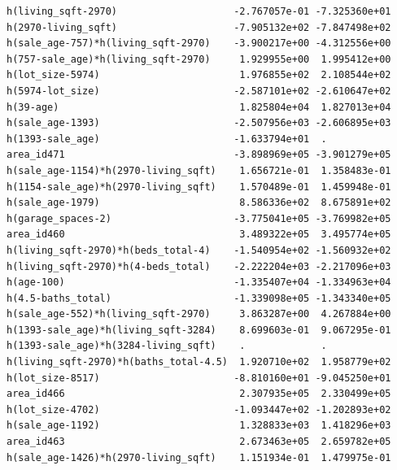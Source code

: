 \documentclass[
]{article}
\begin{document}
\begin{verbatim}
h(living_sqft-2970)                    -2.767057e-01 -7.325360e+01
h(2970-living_sqft)                    -7.905132e+02 -7.847498e+02
h(sale_age-757)*h(living_sqft-2970)    -3.900217e+00 -4.312556e+00
h(757-sale_age)*h(living_sqft-2970)     1.929955e+00  1.995412e+00
h(lot_size-5974)                        1.976855e+02  2.108544e+02
h(5974-lot_size)                       -2.587101e+02 -2.610647e+02
h(39-age)                               1.825804e+04  1.827013e+04
h(sale_age-1393)                       -2.507956e+03 -2.606895e+03
h(1393-sale_age)                       -1.633794e+01  .           
area_id471                             -3.898969e+05 -3.901279e+05
h(sale_age-1154)*h(2970-living_sqft)    1.656721e-01  1.358483e-01
h(1154-sale_age)*h(2970-living_sqft)    1.570489e-01  1.459948e-01
h(sale_age-1979)                        8.586336e+02  8.675891e+02
h(garage_spaces-2)                     -3.775041e+05 -3.769982e+05
area_id460                              3.489322e+05  3.495774e+05
h(living_sqft-2970)*h(beds_total-4)    -1.540954e+02 -1.560932e+02
h(living_sqft-2970)*h(4-beds_total)    -2.222204e+03 -2.217096e+03
h(age-100)                             -1.335407e+04 -1.334963e+04
h(4.5-baths_total)                     -1.339098e+05 -1.343340e+05
h(sale_age-552)*h(living_sqft-2970)     3.863287e+00  4.267884e+00
h(1393-sale_age)*h(living_sqft-3284)    8.699603e-01  9.067295e-01
h(1393-sale_age)*h(3284-living_sqft)    .             .           
h(living_sqft-2970)*h(baths_total-4.5)  1.920710e+02  1.958779e+02
h(lot_size-8517)                       -8.810160e+01 -9.045250e+01
area_id466                              2.307935e+05  2.330499e+05
h(lot_size-4702)                       -1.093447e+02 -1.202893e+02
h(sale_age-1192)                        1.328833e+03  1.418296e+03
area_id463                              2.673463e+05  2.659782e+05
h(sale_age-1426)*h(2970-living_sqft)    1.151934e-01  1.479975e-01
                                                                  

\end{verbatim}
\end{document}
